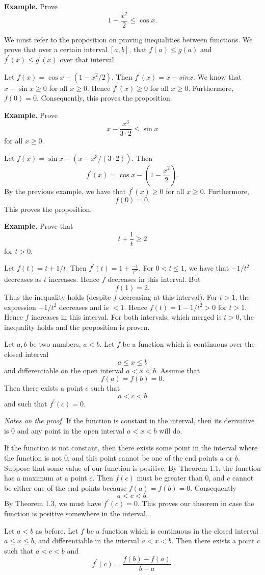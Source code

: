 \textbf{Example.} Prove
\[1 - \frac{x^2}{2} \le \cos x.\]

We must refer to the proposition on proving inequalities between functions. We prove that over a certain interval $[a,b]$, that $f(a) \le g(a)$ and $f^\prime(x) \le g^\prime(x)$ over that interval.

Let $f(x) = \cos x - (1 - x^2/2)$. Then $f^\prime(x) = x - sin x$. We know that $x - \sin x \ge 0$ for all $x \ge 0$. Hence $f^\prime(x) \ge 0$ for all $x \ge 0$. Furthermore, $f(0) = 0$. Consequently, this proves the proposition.

\textbf{Example.} Prove
\[x - \frac{x^3}{3 \cdot 2} \le \sin x\]
for all $x \ge 0$.

Let $f(x) = \sin x - (x - x^3/(3 \cdot 2))$. Then
\[f^\prime(x) = \cos x - (1 - \frac{x^2}{2}).\]
By the previous example, we have that $f^\prime(x) \ge 0$ for all $x \ge 0$. Furthermore,
\[f(0) = 0.\]
This proves the proposition.

\textbf{Example.} Prove that
\[t + \frac{1}{t} \ge 2\]
for $t > 0$.

Let $f(t) = t + 1/t$. Then $f^\prime(t) = 1 + \frac{-1}{t^2}$. For $0 < t \le 1$, we have that $-1/t^2$ decreases as $t$ increases. Hence $f$ decreases in this interval. But
\[f(1) = 2.\]
Thus the inequality holds (despite $f$ decreasing at this interval). For $t > 1$, the expression $-1/t^2$ decreases and is $< 1$. Hence $f(t) = 1 - 1/t^2 > 0$ for $t > 1$. Hence $f$ increases in this interval. For both intervals, which merged is $t > 0$, the inequality holds and the proposition is proven.

\begin{theorem}
  Let $a, b$ be two numbers, $a < b$. Let $f$ be a function which is continuous over the closed interval
  \[a \le x \le b\]
  and differentiable on the open interval $a < x < b$. Assume that
  \[f(a) = f(b) = 0.\]
  Then there exists a point $c$ such that
  \[a < c < b\]
  and such that $f^\prime(c) = 0$.
\end{theorem}

\textit{Notes on the proof.}
If the function is constant in the interval, then its derivative is $0$ and any point in the open interval $a < x < b$ will do.

If the function is not constant, then there exists some point in the interval where the function is not $0$, and this point cannot be one of the end points $a$ or $b$. Suppose that some value of our function is positive. By Theorem 1.1, the function has a maximum at a point $c$. Then $f(c)$ must be greater than $0$, and $c$ cannot be either one of the end points because $f(a) = f(b) = 0$. Consequently
\[a < c < b.\]
By Theorem 1.3, we must have $f^\prime(c) = 0$. This proves our theorem in case the function is positive somewhere in the interval.

\begin{theorem}
  Let $a < b$ as before. Let $f$ be a function which is continuous in the closed interval $a \le x \le b$, and differentiable in the interval $a < x < b$. Then there exists a point $c$ such that $a < c < b$ and
  \[f^\prime(c) = \frac{f(b) - f(a)}{b - a}.\]
\end{theorem}
